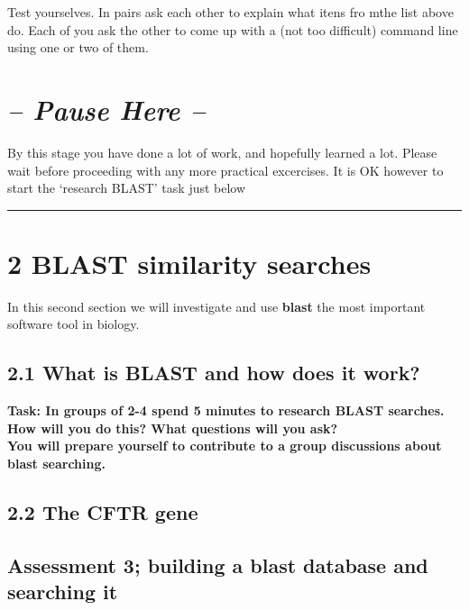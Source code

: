 \documentclass[11pt]{article}
\begin{document}
Test yourselves. In pairs ask each other to explain what itens fro mthe
list above do. Each of you ask the other to come up with a (not too
difficult) command line using one or two of them.

    \hypertarget{pause-here}{%
\section{\texorpdfstring{\emph{-- Pause Here
--}}{-- Pause Here --}}\label{pause-here}}

By this stage you have done a lot of work, and hopefully learned a lot.
Please wait before proceeding with any more practical excercises. It is
OK however to start the `research BLAST' task just below

    \begin{center}\rule{0.5\linewidth}{\linethickness}\end{center}

\hypertarget{blast-similarity-searches}{%
\section{2 BLAST similarity searches}\label{blast-similarity-searches}}

In this second section we will investigate and use \textbf{blast} the
most important software tool in biology.

    \hypertarget{what-is-blast-and-how-does-it-work}{%
\subsection{2.1 What is BLAST and how does it
work?}\label{what-is-blast-and-how-does-it-work}}

\textbf{Task: In groups of 2-4 spend 5 minutes to research BLAST
searches. How will you do this? What questions will you ask?\\
You will prepare yourself to contribute to a group discussions about
blast searching.}

    \hypertarget{the-cftr-gene}{%
\subsection{2.2 The CFTR gene}\label{the-cftr-gene}}

    \hypertarget{assessment-3-building-a-blast-database-and-searching-it}{%
\subsection{Assessment 3; building a blast database and searching
it}\label{assessment-3-building-a-blast-database-and-searching-it}}
\end{document}
